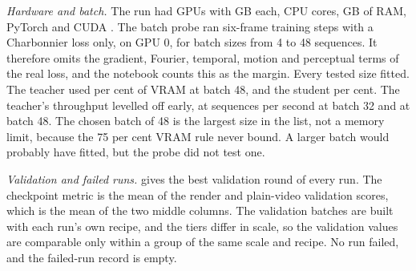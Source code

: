 \emph{Hardware and batch.} The run had  GPUs with  GB each,  CPU cores,  GB of RAM, PyTorch  and CUDA . The batch probe ran six-frame training steps with a Charbonnier loss only, on GPU 0, for batch sizes from 4 to 48 sequences. It therefore omits the gradient, Fourier, temporal, motion and perceptual terms of the real loss, and the notebook counts this as the margin. Every tested size fitted. The teacher used  per cent of VRAM at batch 48, and the student  per cent. The teacher's throughput levelled off early, at  sequences per second at batch 32 and  at batch 48. The chosen batch of 48 is the largest size in the list, not a memory limit, because the 75 per cent VRAM rule never bound. \Observation{} A larger batch would probably have fitted, but the probe did not test one.

\emph{Validation and failed runs.}  gives the best validation round of every run. The checkpoint metric is the mean of the render and plain-video validation scores, which is the mean of the two middle columns. The validation batches are built with each run's own recipe, and the tiers differ in scale, so the validation values are comparable only within a group of the same scale and recipe. No run failed, and the failed-run record is empty.

